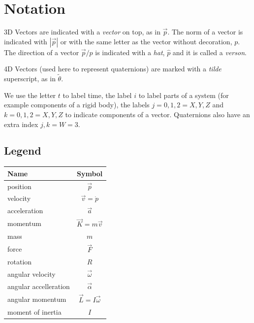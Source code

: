 \documentclass[12pt]{article}
\begin{document}
\section{Notation}

3D Vectors are indicated with a {\it vector} on top, as in $\vec p$. The norm of a vector is indicated with $|\vec p|$ or with the same letter as the vector without decoration, $p$. The direction of a vector $\vec p/p$ is indicated with a {\it hat}, $\hat p$ and it is called a {\it verson}.

4D Vectors (used here to represent quaternions) are marked with a {\it tilde} superscript, as in $\tilde \theta$.

We use the letter $t$ to label time, the label $i$ to label parts of a system (for example components of a rigid body), the labels $j=0,1,2=X,Y,Z$ and $k=0,1,2=X,Y,Z$ to indicate components of a vector. Quaternions also have an extra index $j,k=W=3$.

\subsection{Legend}

\begin{tabular}{|l|c|} \hline
Name & Symbol \\ \hline
position & $\vec p$ \\
velocity & $\vec v = \dot p$ \\
acceleration & $\vec a$ \\
momentum & $\vec K = m \vec v$ \\
mass & $m$ \\
force & $\vec F$ \\
rotation & $R$ \\
angular velocity & $\vec \omega$ \\
angular accelleration & $\vec \alpha$ \\
angular momentum & $\vec L = I \vec \omega$ \\
moment of inertia & $I$ \\ \hline
\end{tabular}
\end{document}

